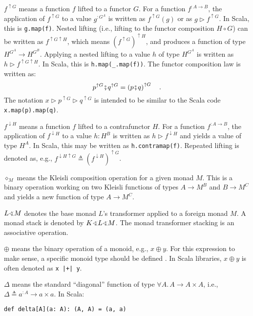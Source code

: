 $f^{\uparrow G}$ means a function $f$ lifted to a functor $G$.
For a function $f^{:A\rightarrow B}$, the application of $f^{\uparrow G}$
to a value $g^{:G^{A}}$ is written as $f^{\uparrow G}(g)$ or as
$g\triangleright f^{\uparrow G}$. In Scala, this is \lstinline!g.map(f)!.
Nested lifting (i.e., lifting to the functor composition $H\circ G$)
can be written as $f^{\uparrow G\uparrow H}$, which means $\left(f^{\uparrow G}\right)^{\uparrow H}$,
and produces a function of type $H^{G^{A}}\rightarrow H^{G^{B}}$.
Applying a nested lifting to a value $h$ of type $H^{G^{A}}$ is
written as $h\triangleright f^{\uparrow G\uparrow H}$. In Scala,
this is \lstinline!h.map(_.map(f))!. The functor composition law
is written as:
\[
p^{\uparrow G}\bef q^{\uparrow G}=\left(p\bef q\right)^{\uparrow G}\quad.
\]
The notation $x\triangleright p^{\uparrow G}\triangleright q^{\uparrow G}$
is intended to be similar to the Scala code \lstinline!x.map(p).map(q)!.

$f^{\downarrow H}$ means a function $f$ lifted to a contrafunctor
$H$. For a function $f^{:A\rightarrow B}$, the application of $f^{\downarrow H}$
to a value $h:H^{B}$ is written as $h\triangleright f^{\downarrow H}$
and yields a value of type $H^{A}$. In Scala, this may be written
as \lstinline!h.contramap(f)!. Repeated lifting is denoted as, e.g.,
$f^{\downarrow H\uparrow G}\triangleq(f^{\downarrow H})^{\uparrow G}$.

$\diamond_{M}$ means the Kleisli composition operation for a given
monad $M$. This is a binary operation working on two Kleisli functions
of types $A\rightarrow M^{B}$ and $B\rightarrow M^{C}$ and yields
a new function of type $A\rightarrow M^{C}$.

$L\varangle M$ denotes the base monad $L$\textsf{'}s transformer applied
to a foreign monad $M$. A monad stack is denoted by $K\varangle L\varangle M$.
The monad transformer stacking is an associative operation.

$\oplus$ means the binary operation of a monoid, e.g., $x\oplus y$.
For this expression to make sense, a specific monoid type should be
defined . In Scala libraries, $x\oplus y$ is often denoted as \lstinline!x |+| y!.

$\Delta$ means the standard \textsf{``}diagonal\textsf{''} function of type $\forall A.\,A\rightarrow A\times A$,
i.e., $\Delta\triangleq a^{:A}\rightarrow a\times a$. In Scala:
\begin{lstlisting}
def delta[A](a: A): (A, A) = (a, a)
\end{lstlisting}

